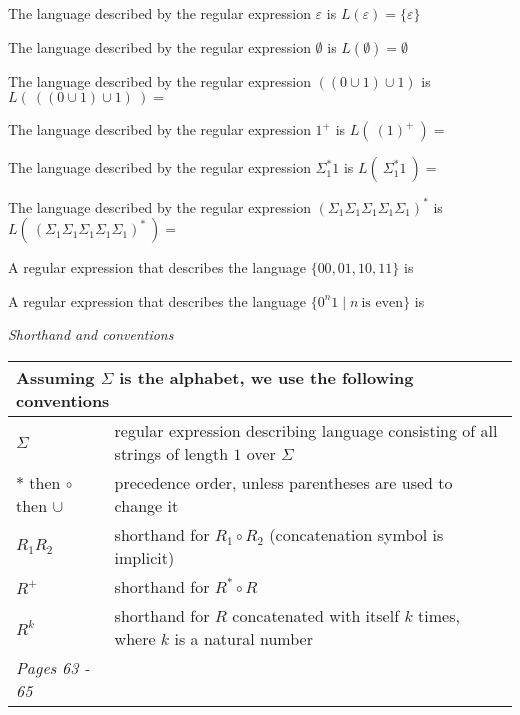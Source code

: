\documentclass[12pt, oneside]{article}
\begin{document}
The language described by the regular expression $\varepsilon$ is $L(\varepsilon) = \{ \varepsilon  \}$

The language described by the regular expression $\emptyset$ is $L(\emptyset) = \emptyset$

The language described by the regular expression $((0 \cup 1) \cup 1)$ is $L(~((0 \cup 1) \cup 1)~) = $

\vfill

The language described by the regular expression $1^+$ is $L(~(1)^+~) = $

\vfill

The language described by the regular expression $\Sigma_1^* 1$ is $L(~\Sigma_1^* 1~) = $

\vfill

The language described by the regular expression $(\Sigma_1 \Sigma_1 \Sigma_1 \Sigma_1 \Sigma_1)^*$ 
is $L(~(\Sigma_1 \Sigma_1 \Sigma_1 \Sigma_1 \Sigma_1)^*~) = $

\vfill

A regular expression that describes the language $\{00, 01, 10, 11\}$ is 

\vfill

A regular expression that describes the language $\{ 0^n1 \mid n~\text{is even} \}$ is

\vfill

{\it Shorthand and conventions}
    
\begin{center}
    \begin{tabular}{|ll|}
    \hline
    \multicolumn{2}{|l|}{Assuming $\Sigma$ is the alphabet, we use the following conventions}\\
    \hline
    $\Sigma$   & regular  expression describing language consisting of  all strings  of length  $1$ over $\Sigma$\\
    $*$ then $\circ$ then $\cup$   & precedence order, unless parentheses are used to change it\\
    $R_1R_2$ & shorthand  for  $R_1  \circ R_2$ (concatenation symbol is implicit) \\
    $R^+$ & shorthand for $R^* \circ R$ \\
    $R^k$ & shorthand for $R$ concatenated with itself $k$ times, where $k$ is a natural number\\
    \hline
    {\it Pages 63 - 65 }& \\
    \hline
    \end{tabular}
\end{center}
\end{document}
